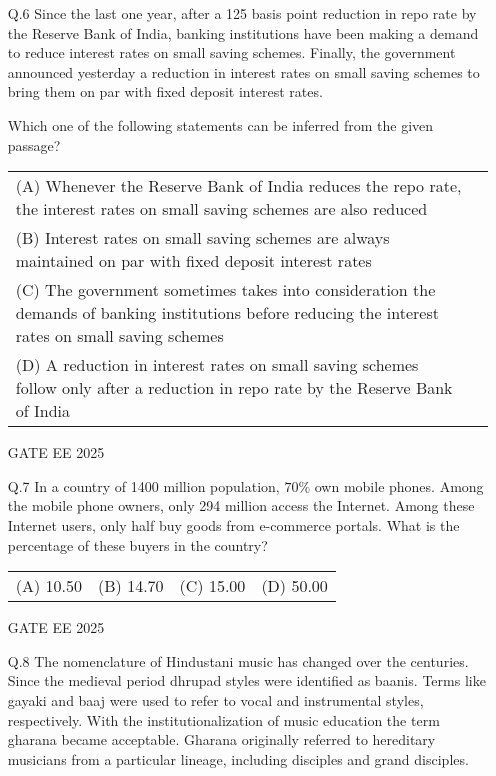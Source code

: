 \documentclass[journal]{IEEEtran}
\begin{document}
\begin{enumerate}[leftmargin=*]
    \item[Q.6] Since the last one year, after a 125 basis point reduction in repo rate by the Reserve Bank of India, banking institutions have been making a demand to reduce interest rates on small saving schemes. Finally, the government announced yesterday a reduction in interest rates on small saving schemes to bring them on par with fixed deposit interest rates.
    
    Which one of the following statements can be inferred from the given passage?
    
    \begin{tabular}{ll}
        (A) Whenever the Reserve Bank of India reduces the repo rate, the interest rates on small saving schemes are also reduced \\
        (B) Interest rates on small saving schemes are always maintained on par with fixed deposit interest rates \\
        (C) The government sometimes takes into consideration the demands of banking institutions before reducing the interest rates on small saving schemes \\
        (D) A reduction in interest rates on small saving schemes follow only after a reduction in repo rate by the Reserve Bank of India
    \end{tabular}
    GATE EE 2025
     \vspace{0.5cm} 
    \item[Q.7] In a country of 1400 million population, $70\%$ own mobile phones. Among the mobile phone owners, only 294 million access the Internet. Among these Internet users, only half buy goods from e-commerce portals. What is the percentage of these buyers in the country?
    
    \begin{tabular}{llll}
        (A) 10.50 & (B) 14.70 & (C) 15.00 & (D) 50.00
    \end{tabular}
    GATE EE 2025
     \vspace{0.5cm} 
    \item[Q.8] The nomenclature of Hindustani music has changed over the centuries. Since the medieval period dhrupad styles were identified as baanis. Terms like gayaki and baaj were used to refer to vocal and instrumental styles, respectively. With the institutionalization of music education the term gharana became acceptable. Gharana originally referred to hereditary musicians from a particular lineage, including disciples and grand disciples.
    

\end{enumerate}
\end{document}
